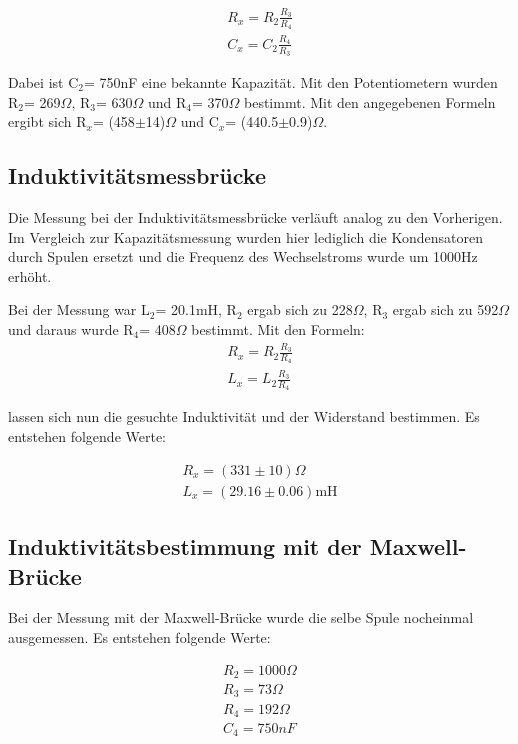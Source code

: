 \begin{align*}
    R_x = R_2 \frac{R_3}{R_4}\\
    C_x = C_2 \frac{R_4}{R_3}
\end{align*}

Dabei ist C$_2$= 750nF eine bekannte Kapazität. Mit den Potentiometern wurden R$_2$= 269$\Omega$, R$_3$= 630$\Omega$  und R$_4$= 370$\Omega$ bestimmt. Mit den angegebenen Formeln ergibt sich R$_x$= (458$\pm$14)$\Omega$ und C$_x$= (440.5$\pm$0.9)$\Omega$.

\subsection{Induktivitätsmessbrücke}

Die Messung bei der Induktivitätsmessbrücke verläuft analog zu den Vorherigen. Im Vergleich zur Kapazitätsmessung wurden hier lediglich die Kondensatoren durch Spulen ersetzt und die Frequenz des Wechselstroms wurde um 1000Hz erhöht.

Bei der Messung war L$_2$= 20.1mH, R$_2$ ergab sich zu 228$\Omega$, R$_3$ ergab sich zu 592$\Omega$ und daraus wurde R$_4$= 408$\Omega$ bestimmt.
Mit den Formeln:
\begin{align*}
    R_x = R_2 \frac{R_3}{R_4}\\
    L_x = L_2 \frac{R_3}{R_4}
\end{align*}

lassen sich nun die gesuchte Induktivität und der Widerstand bestimmen. Es entstehen folgende Werte:

\begin{align*}
    R_x = (331\pm 10)\Omega \\
    L_x = (29.16\pm 0.06)\text{mH}
\end{align*}

\subsection{Induktivitätsbestimmung mit der Maxwell-Brücke}

Bei der Messung mit der Maxwell-Brücke wurde die selbe Spule nocheinmal ausgemessen. Es entstehen folgende Werte:

\begin{align*}
    R_2 = 1000\Omega \\
    R_3 = 73\Omega \\
    R_4 = 192\Omega \\
    C_4 = 750 nF
\end{align*}

